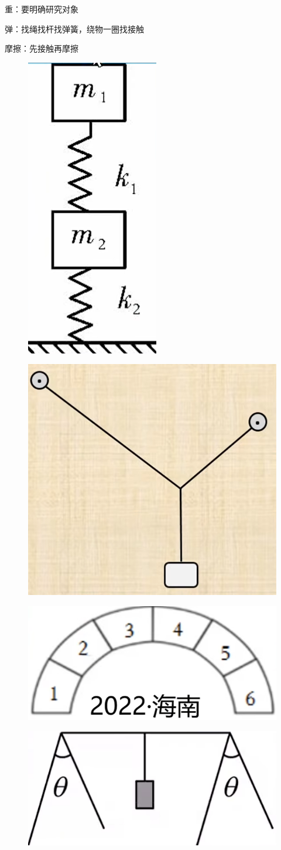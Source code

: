\documentclass[lang=cn,10pt]{elegantbook}
\begin{document}
	\begin{remark}
		
		重：要明确研究对象
		
		弹：找绳找杆找弹簧，绕物一圈找接触
		
		摩擦：先接触再摩擦
	\end{remark}
	\begin{example}
		\begin{figure}[H]
			\centering
			\includegraphics[width=0.1\linewidth]{image/13}
		\end{figure}
	\end{example}
	\begin{example}
		\begin{figure}[H]
			\centering
			\includegraphics[width=0.2\linewidth]{image/14}
		\end{figure}
	\end{example}
	\begin{example}
		\begin{figure}[H]
			\centering
			\includegraphics[width=0.24\linewidth]{image/17}
		\end{figure}
	\end{example}
	\begin{example}
		\begin{figure}[H]
			\centering
			\includegraphics[width=0.4\linewidth]{image/12}
		\end{figure}
	\end{example}
\end{document}
